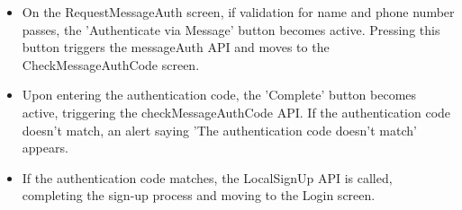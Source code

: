 \documentclass[conference]{IEEEtran}
\begin{document}
\begin{itemize}
\begin{itemize}
        \item On the RequestMessageAuth screen, if validation for name and phone number passes, the 'Authenticate via Message' button becomes active. Pressing this button triggers the messageAuth API and moves to the CheckMessageAuthCode screen.
        \item Upon entering the authentication code, the 'Complete' button becomes active, triggering the checkMessageAuthCode API. If the authentication code doesn't match, an alert saying 'The authentication code doesn't match' appears.
        \item If the authentication code matches, the LocalSignUp API is called, completing the sign-up process and moving to the Login screen.
        \\
    \end{itemize}
\end{itemize}
\newpage
\end{document}
